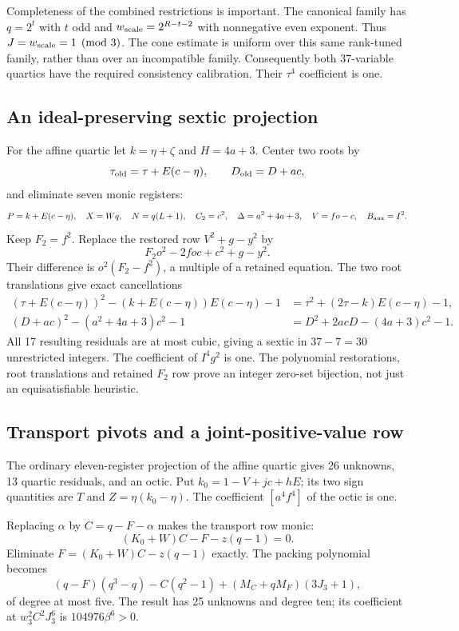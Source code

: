 Completeness of the combined restrictions is important. The canonical
family has $q=2^t$ with $t$ odd and
$w_{\rm scale}=2^{R-t-2}$ with nonnegative even exponent. Thus
$J=w_{\rm scale}=1\pmod3$. The cone estimate is uniform over this
same rank-tuned family, rather than over an incompatible family.
Consequently both 37-variable quartics have the required consistency
calibration. Their $\tau^4$ coefficient is one.

\subsection{An ideal-preserving sextic projection}
For the affine quartic let $k=\eta+\zeta$ and $H=4a+3$.
Center two roots by
\[
 \tau_{\rm old}=\tau+E(c-\eta),\qquad D_{\rm old}=D+ac,
\]
and eliminate seven monic registers:
\[
 P=k+E(c-\eta),\quad X=Wq,\quad N=q(L+1),\quad C_2=c^2,
 \quad\Delta=a^2+4a+3,\quad V=fo-c,\quad B_{\rm aux}=I^2.
\]
Keep $F_2=f^2$. Replace the restored row $V^2+g-y^2$ by
\[
 F_2o^2-2foc+c^2+g-y^2.
\]
Their difference is $o^2(F_2-f^2)$, a multiple of a retained equation.
The two root translations give exact cancellations
\begin{align*}
 (\tau+E(c-\eta))^2-(k+E(c-\eta))E(c-\eta)-1
 &=\tau^2+(2\tau-k)E(c-\eta)-1,\\
 (D+ac)^2-(a^2+4a+3)c^2-1
 &=D^2+2acD-(4a+3)c^2-1.
\end{align*}
All 17 resulting residuals are at most cubic, giving a sextic in
$37-7=30$ unrestricted integers. The coefficient of $I^4g^2$ is one.
The polynomial restorations, root translations and retained $F_2$ row
prove an integer zero-set bijection, not just an equisatisfiable heuristic.

\subsection{Transport pivots and a joint-positive-value row}
The ordinary eleven-register projection of the affine quartic gives
26 unknowns, 13 quartic residuals, and an octic. Put
$k_0=1-V+jc+hE$; its two sign quantities are $T$ and
$Z=\eta(k_0-\eta)$. The coefficient $[a^4f^4]$ of the octic is one.

Replacing $\alpha$ by $C=q-F-\alpha$ makes the transport row monic:
\[
 (K_0+W)C-F-z(q-1)=0.
\]
Eliminate $F=(K_0+W)C-z(q-1)$ exactly. The packing polynomial becomes
\[
 (q-F)(q^3-q)-C(q^2-1)+(M_C+qM_F)(3J_3+1),
\]
of degree at most five. The result has 25 unknowns and degree ten;
its coefficient at $w_3^2C^2J_3^6$ is $104976\beta^6>0$.

